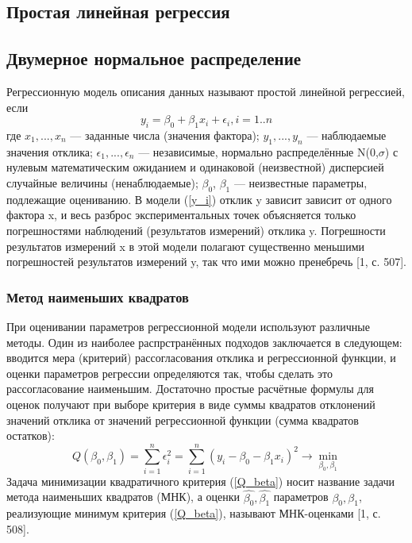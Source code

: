 \documentclass[12pt,a4paper]{scrartcl}
\begin{document}
\subsection{Простая линейная регрессия}

\subsection{Двумерное нормальное распределение}
    Регрессионную модель описания данных называют простой линейной регрессией, если
	\begin{equation}
	    y_{i} = \beta_{0} + \beta_{1}x_{i} + \epsilon_{i},  i = 1..n
	    \label{y_i}
	\end{equation}
	где $x_{1},...,x_{n}$ — заданные числа (значения фактора); $y_{1},...,y_{n}$ — наблюдаемые значения отклика; $\epsilon_{1},...,\epsilon_{n}$ — независимые, нормально распределённые N(0,$\sigma$) с нулевым математическим ожиданием и одинаковой (неизвестной) дисперсией случайные величины (ненаблюдаемые); $\beta_{0}$, $\beta_{1}$ — неизвестные параметры, подлежащие оцениванию.
    В модели (\ref{y_i}) отклик y зависит зависит от одного фактора x, и весь разброс экспериментальных точек объясняется только погрешностями наблюдений (результатов измерений) отклика y. Погрешности результатов измерений x в этой модели полагают существенно меньшими погрешностей результатов измерений y, так что ими можно пренебречь [1, с. 507].


	
	\subsubsection{Метод наименьших квадратов}
	При оценивании параметров регрессионной модели используют различные методы. Один из наиболее распрстранённых подходов заключается в следующем: вводится мера (критерий) рассогласования отклика и регрессионной функции, и оценки параметров регрессии определяются так, чтобы сделать это рассогласование наименьшим. Достаточно простые расчётные формулы для оценок получают при выборе критерия в виде суммы квадратов отклонений значений отклика от значений регрессионной функции (сумма квадратов остатков):
	\begin{equation}
	    Q(\beta_{0}, \beta_{1}) = \sum_{i=1}^{n}{\epsilon_{i}^{2}} = 
	    \sum_{i=1}^{n}{(y_{i} - \beta_{0} - \beta_{1}x_{i})^{2}}\rightarrow \min_{\beta_{0}, \beta_{1}}
	    \label{Q_beta}
	\end{equation}
	Задача минимизации квадратичного критерия (\ref{Q_beta}) носит название задачи метода наименьших квадратов (МНК), а оценки $\hat{\beta_{0}}, \hat{\beta_{1}}$ параметров $\beta_{0}, \beta_{1}$, реализующие минимум критерия (\ref{Q_beta}), называют МНК-оценками [1, с. 508]. 
\end{document}
